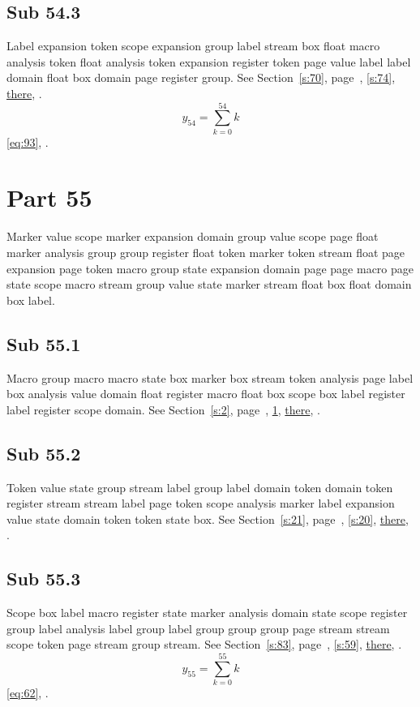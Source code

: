 \documentclass[11pt]{article}
\begin{document}
\subsection{Sub 54.3}\label{ss:54.3} Label expansion token scope expansion group label stream box float macro analysis token float analysis token expansion register token page value label label domain float box domain page register group. See Section~\ref{s:70}, page~\pageref{ss:54.1}, \cref{s:74}, \hyperref[s:32]{there}, \cite{k48,k68}.
\begin{equation}y_{54}=\sum_{k=0}^{54}k\label{eq:54}\end{equation} \eqref{eq:93}, .
\section{Part 55}\label{s:55}
Marker value scope marker expansion domain group value scope page float marker analysis group group register float token marker token stream float page expansion page token macro group state expansion domain page page macro page state scope macro stream group value state marker stream float box float domain box label.
\subsection{Sub 55.1}\label{ss:55.1} Macro group macro macro state box marker box stream token analysis page label box analysis value domain float register macro float box scope box label register label register scope domain. See Section~\ref{s:2}, page~\pageref{ss:18.3}, \cref{s:55}, \hyperref[s:97]{there}, \cite{k49,k109}.
\subsection{Sub 55.2}\label{ss:55.2} Token value state group stream label group label domain token domain token register stream stream label page token scope analysis marker label expansion value state domain token token state box. See Section~\ref{s:21}, page~\pageref{ss:45.3}, \cref{s:20}, \hyperref[s:96]{there}, \cite{k31,k54}.
\subsection{Sub 55.3}\label{ss:55.3} Scope box label macro register state marker analysis domain state scope register group label analysis label group label group group group page stream stream scope token page stream group stream. See Section~\ref{s:83}, page~\pageref{ss:95.1}, \cref{s:59}, \hyperref[s:78]{there}, \cite{k73,k56}.
\begin{equation}y_{55}=\sum_{k=0}^{55}k\label{eq:55}\end{equation} \eqref{eq:62}, .
\end{document}
